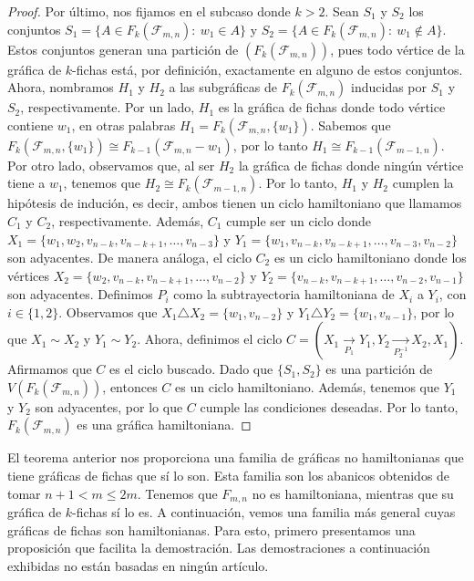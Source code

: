 \begin{proof}
    Por \'ultimo, nos fijamos en el subcaso donde $k>2$. Sean $S_1$ y $S_2$ los
    conjuntos $S_1=\{A \in F_k(\mathcal{F}_{m,n}) \colon\ w_1 \in A\}$ y
    $S_2=\{A \in F_k(\mathcal{F}_{m,n}) \colon\ w_1 \notin A\}$. Estos conjuntos
    generan una partici\'on de $(F_k(\mathcal{F}_{m,n}))$, pues todo v\'ertice
    de la gr\'afica de $k$-fichas est\'a, por definici\'on, exactamente en
    alguno de estos conjuntos. Ahora, nombramos $H_1$ y $H_2$ a las
    subgr\'aficas de $F_k(\mathcal{F}_{m,n})$ inducidas por $S_1$ y $S_2$,
    respectivamente. Por un lado, $H_1$ es la gr\'afica de fichas donde todo
    v\'ertice contiene $w_1$, en otras palabras $H_1=
    F_k(\mathcal{F}_{m,n},\{w_1\})$. Sabemos que $F_k(\mathcal{F}_{m,n},\{w_1\})
    \cong F_{k-1}(\mathcal{F}_{m,n}- w_1)$, por lo tanto $H_1 \cong
    F_{k-1}(\mathcal{F}_{m-1,n})$. Por otro lado, observamos que, al ser $H_2$
    la gr\'afica de fichas donde ning\'un v\'ertice tiene a $w_1$, tenemos que
    $H_2 \cong F_k(\mathcal{F}_{m-1,n})$. Por lo tanto, $H_1$ y $H_2$ cumplen la
    hip\'otesis de induci\'on, es decir, ambos tienen un ciclo hamiltoniano que
    llamamos $C_1$ y $C_2$, respectivamente. Adem\'as, $C_1$ cumple ser un ciclo
    donde $X_1 = \{w_1, w_2,v_{n-k},v_{n-k+1}, \dots, v_{n-3}\}$ y $Y_1 =
    \{w_1,v_{n-k},v_{n-k+1}, \dots, v_{n-3},v_{n-2}\}$ son adyacentes. De manera
    an\'aloga, el ciclo $C_2$ es un ciclo hamiltoniano donde los v\'ertices $X_2
    = \{ w_2,v_{n-k},v_{n-k+1}, \dots, v_{n-2}\}$ y $Y_2 = \{v_{n-k},v_{n-k+1},
    \dots, v_{n-2},v_{n-1}\}$ son adyacentes. Definimos $P_i$ como la
    subtrayectoria hamiltoniana de $X_i$ a $Y_i$, con 
    \linebreak
    $i \in \{ 1,2 \}$. Observamos que $X_1 \triangle X_2 = \{w_1,v_{n-2}\}$ y
    $Y_1 \triangle Y_2 = \{w_1, v_{n-1}\}$, por lo que $X_1 \sim X_2$ y $Y_1
    \sim Y_2$. Ahora, definimos el ciclo $C = (X_1 \xrightarrow[P_1]{}Y_1,Y_2
    \xrightarrow[P_2^{-1}]{}X_2,X_1)$. Afirmamos que $C$ es el ciclo buscado.
    Dado que $\{S_1,S_2\}$ es una partici\'on de $V(F_k(\mathcal{F}_{m,n}))$,
    entonces $C$ es un ciclo hamiltoniano. Adem\'as, tenemos que $Y_1$ y $Y_2$
    son adyacentes, por lo que $C$ cumple las condiciones deseadas. Por lo
    tanto, $F_k(\mathcal{F}_{m,n})$ es una gr\'afica hamiltoniana.
\end{proof}

El teorema anterior nos proporciona una familia de gr\'aficas no hamiltonianas
que tiene gr\'aficas de fichas que s\'i lo son. Esta familia son los abanicos
obtenidos de tomar $n+1 < m \leq 2m$. Tenemos que $F_{m,n}$ no es hamiltoniana,
mientras que su gr\'afica de $k$-fichas s\'i lo es. A continuaci\'on, vemos una
familia m\'as general cuyas gr\'aficas de fichas son hamiltonianas. Para esto,
primero presentamos una proposici\'on que facilita la demostraci\'on. Las
demostraciones a continuaci\'on exhibidas no est\'an basadas en ning\'un
art\'iculo.

